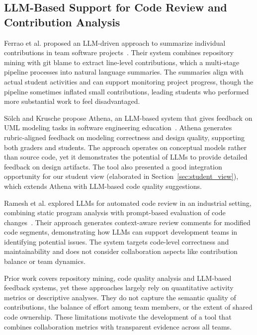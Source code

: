 \documentclass[sigconf]{acmart}
\begin{document}
\subsection{LLM-Based Support for Code Review and Contribution Analysis}
Ferrao et al. proposed an LLM-driven approach to summarize individual contributions in team software projects~\cite{ferrao2025llm}. Their system combines repository mining with git blame to extract line-level contributions, which a multi-stage pipeline processes into natural language summaries. The summaries align with actual student activities and can support monitoring project progress, though the pipeline sometimes inflated small contributions, leading students who performed more substantial work to feel disadvantaged.

S\"olch and Krusche propose Athena, an LLM-based system that gives feedback on UML modeling tasks in software engineering education~\cite{soelch2026scaling}. Athena generates rubric-aligned feedback on modeling correctness and design quality, supporting both graders and students. The approach operates on conceptual models rather than source code, yet it demonstrates the potential of LLMs to provide detailed feedback on design artifacts. The tool also presented a good integration opportunity for our student view (elaborated in Section~\ref{sec:student_view}), which extends Athena with LLM-based code quality suggestions.

Ramesh et al. explored LLMs for automated code review in an industrial setting, combining static program analysis with prompt-based evaluation of code changes~\cite{ramesh2025ericsson}. Their approach generates context-aware review comments for modified code segments, demonstrating how LLMs can support development teams in identifying potential issues. The system targets code-level correctness and maintainability and does not consider collaboration aspects like contribution balance or team dynamics.

Prior work covers repository mining, code quality analysis and LLM-based feedback systems, yet these approaches largely rely on quantitative activity metrics or descriptive analyses. They do not capture the semantic quality of contributions, the balance of effort among team members, or the extent of shared code ownership. These limitations motivate the development of a tool that combines collaboration metrics with transparent evidence across all teams.

\end{document}
